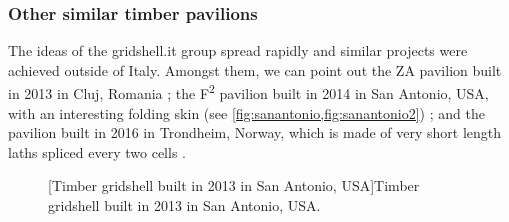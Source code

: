 \subsubsection{Other similar timber pavilions}
The ideas of the gridshell.it group spread rapidly and similar projects were achieved outside of Italy. Amongst them, we can point out the ZA pavilion built in 2013 in Cluj, Romania \cite{Naicu2014} ; the F\textsuperscript{2} pavilion built in 2014 in San Antonio, USA, with an interesting folding skin (see \cref{fig:sanantonio,fig:sanantonio2}) ; and the pavilion built in 2016 in Trondheim, Norway, which is made of very short length laths spliced every two cells \cite{Mork2016}.
\begin{figure}[h]
		\hspace*{\fill}
		\vspace{10pt}
		[Timber gridshell built in 2013 in San Antonio, USA]{Timber gridshell built in 2013 in San Antonio, USA.}
		\label{fig:otherpav}    
\end{figure}

